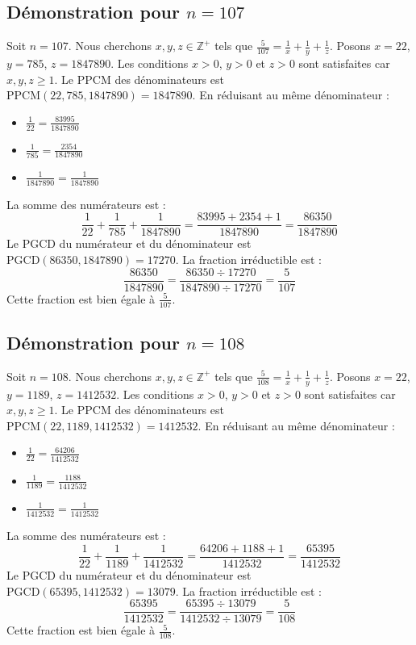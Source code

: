 \documentclass[11pt,a4paper]{article}
\begin{document}
\subsection{Démonstration pour $n = 107$}
Soit $n = 107$. Nous cherchons $x, y, z \in \mathbb{Z}^{+}$ tels que $\frac{5}{107} = \frac{1}{x} + \frac{1}{y} + \frac{1}{z}$.
Posons $x = 22$, $y = 785$, $z = 1847890$.
Les conditions $x > 0$, $y > 0$ et $z > 0$ sont satisfaites car $x, y, z \geq 1$.
Le PPCM des dénominateurs est $\text{PPCM}(22, 785, 1847890) = 1847890$.
En réduisant au même dénominateur :
\begin{itemize}
    \item $\frac{1}{22} = \frac{83995}{1847890}$
    \item $\frac{1}{785} = \frac{2354}{1847890}$
    \item $\frac{1}{1847890} = \frac{1}{1847890}$
\end{itemize}
La somme des numérateurs est :
$$ \frac{1}{22} + \frac{1}{785} + \frac{1}{1847890} = \frac{83995 + 2354 + 1}{1847890} = \frac{86350}{1847890} $$
Le PGCD du numérateur et du dénominateur est $\text{PGCD}(86350, 1847890) = 17270$.
La fraction irréductible est :
$$ \frac{86350}{1847890} = \frac{86350 \div 17270}{1847890 \div 17270} = \frac{5}{107} $$
Cette fraction est bien égale à $\frac{5}{107}$.

\subsection{Démonstration pour $n = 108$}
Soit $n = 108$. Nous cherchons $x, y, z \in \mathbb{Z}^{+}$ tels que $\frac{5}{108} = \frac{1}{x} + \frac{1}{y} + \frac{1}{z}$.
Posons $x = 22$, $y = 1189$, $z = 1412532$.
Les conditions $x > 0$, $y > 0$ et $z > 0$ sont satisfaites car $x, y, z \geq 1$.
Le PPCM des dénominateurs est $\text{PPCM}(22, 1189, 1412532) = 1412532$.
En réduisant au même dénominateur :
\begin{itemize}
    \item $\frac{1}{22} = \frac{64206}{1412532}$
    \item $\frac{1}{1189} = \frac{1188}{1412532}$
    \item $\frac{1}{1412532} = \frac{1}{1412532}$
\end{itemize}
La somme des numérateurs est :
$$ \frac{1}{22} + \frac{1}{1189} + \frac{1}{1412532} = \frac{64206 + 1188 + 1}{1412532} = \frac{65395}{1412532} $$
Le PGCD du numérateur et du dénominateur est $\text{PGCD}(65395, 1412532) = 13079$.
La fraction irréductible est :
$$ \frac{65395}{1412532} = \frac{65395 \div 13079}{1412532 \div 13079} = \frac{5}{108} $$
Cette fraction est bien égale à $\frac{5}{108}$.
\end{document}
